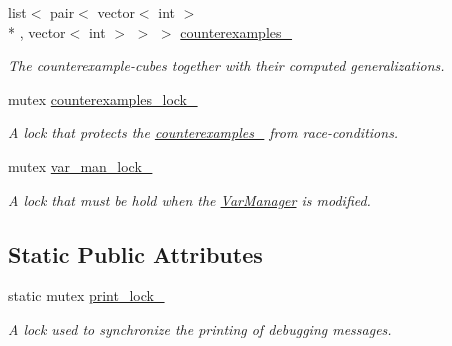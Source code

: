 \begin{DoxyCompactItemize}
list$<$ pair$<$ vector$<$ int $>$\\*
, vector$<$ int $>$ $>$ $>$ \hyperlink{classParallelLearner_a974943e3e2145b3407f689b64acdd33f}{counterexamples\-\_\-}
\begin{DoxyCompactList}\small\item\em The counterexample-\/cubes together with their computed generalizations. \end{DoxyCompactList}\item 
mutex \hyperlink{classParallelLearner_a454c81908f2d3cb4c24b042739adc4ec}{counterexamples\-\_\-lock\-\_\-}
\begin{DoxyCompactList}\small\item\em A lock that protects the \hyperlink{classParallelLearner_a974943e3e2145b3407f689b64acdd33f}{counterexamples\-\_\-} from race-\/conditions. \end{DoxyCompactList}\item 
mutex \hyperlink{classParallelLearner_abdd409a5ef29bd4ba6b7213e9d4a067b}{var\-\_\-man\-\_\-lock\-\_\-}
\begin{DoxyCompactList}\small\item\em A lock that must be hold when the \hyperlink{classVarManager}{Var\-Manager} is modified. \end{DoxyCompactList}\end{DoxyCompactItemize}
\subsection*{Static Public Attributes}
\begin{DoxyCompactItemize}
\item 
static mutex \hyperlink{classParallelLearner_a5bc71a2c35fa976d792bf0e80de31a39}{print\-\_\-lock\-\_\-}
\begin{DoxyCompactList}\small\item\em A lock used to synchronize the printing of debugging messages. \end{DoxyCompactList}\end{DoxyCompactItemize}

